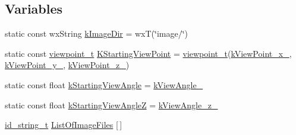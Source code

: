 \subsection*{Variables}
\begin{DoxyCompactItemize}
\item 
static const wx\-String \hyperlink{a00184_a00193898f1339b6ac06edfd2bfb01893}{k\-Image\-Dir} = wx\-T(\char`\"{}image/\char`\"{})
\item 
static const \hyperlink{a00154}{viewpoint\-\_\-t} \hyperlink{a00184_ae4f8f522043f5cc48c4d4c962f8af3c2}{K\-Starting\-View\-Point} = \hyperlink{a00154}{viewpoint\-\_\-t}(\hyperlink{a00186_a2af52f51227fade1fa8e6d66aa763eb0}{k\-View\-Point\-\_\-x\-\_}, \hyperlink{a00186_ad7b3835ae2b765cc0a2ae45375185ca3}{k\-View\-Point\-\_\-y\-\_}, \hyperlink{a00186_a2d9e6998200c6314e45cd8f14f852a42}{k\-View\-Point\-\_\-z\-\_})
\item 
static const float \hyperlink{a00184_a7aabde0cecdcb8244ef4a617bba64503}{k\-Starting\-View\-Angle} = \hyperlink{a00186_a116a11673cf1e70127632b771e279d31}{k\-View\-Angle\-\_}
\item 
static const float \hyperlink{a00184_a7673cbe4ece51f01f9703a61be3005d0}{k\-Starting\-View\-Angle\-Z} = \hyperlink{a00186_a867bb7d5df7bc8cff729ce89c7326a22}{k\-View\-Angle\-\_\-z\-\_}
\item 
\hyperlink{a00109}{id\-\_\-string\-\_\-t} \hyperlink{a00184_a1095b4456e76463cd865063ff1864d90}{List\-Of\-Image\-Files} \mbox{[}$\,$\mbox{]}
\end{DoxyCompactItemize}


